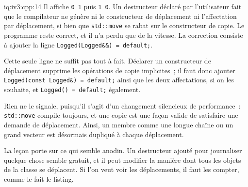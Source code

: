 \begin{solution}{iq:iv3:cpp:14}
Il affiche \texttt{0 1} puis \texttt{1 0}. Un destructeur déclaré par l'utilisateur fait que le compilateur ne génère ni le constructeur de déplacement ni l'affectation par déplacement, si bien que \texttt{std::move} se rabat sur le constructeur de copie. Le programme reste correct, et il n'a perdu que de la vitesse. La correction consiste à ajouter la ligne \texttt{Logged(Logged\&\&) = default;}.

Cette seule ligne ne suffit pas tout à fait. Déclarer un constructeur de déplacement supprime les opérations de copie implicites~; il faut donc ajouter \texttt{Logged(const Logged\&) = default;} ainsi que les deux affectations, si on les souhaite, et \texttt{Logged() = default;} également.

Rien ne le signale, puisqu'il s'agit d'un changement silencieux de performance~: \texttt{std::move} compile toujours, et une copie est une façon valide de satisfaire une demande de déplacement. Ainsi, un membre comme une longue chaîne ou un grand vecteur est désormais dupliqué à chaque déplacement.

La leçon porte sur ce qui semble anodin. Un destructeur ajouté pour journaliser quelque chose semble gratuit, et il peut modifier la manière dont tous les objets de la classe se déplacent. Si l'on veut voir les déplacements, il faut les compter, comme le fait le listing.

\end{solution}

